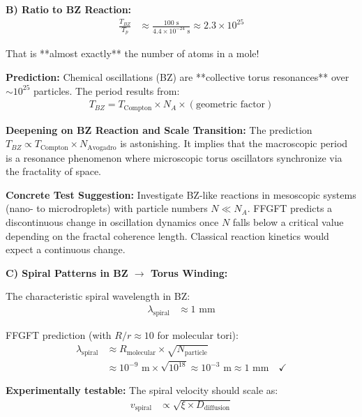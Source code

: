 	\textbf{B) Ratio to BZ Reaction:}
	\begin{align*}
		\frac{T_{BZ}}{T_p} &\approx \frac{100 \text{ s}}{4.4 \times 10^{-24} \text{ s}} \approx 2.3 \times 10^{25}
	\end{align*}
	
	That is **almost exactly** the number of atoms in a mole!
	
	\textbf{Prediction:} Chemical oscillations (BZ) are **collective torus resonances** over $\sim 10^{25}$ particles. The period results from:
	\begin{align*}
		T_{BZ} = T_{\text{Compton}} \times N_A \times (\text{geometric factor})
	\end{align*}
	
	\textbf{Deepening on BZ Reaction and Scale Transition:}
	The prediction $T_{BZ} \propto T_{\text{Compton}} \times N_{\text{Avogadro}}$ is astonishing. It implies that the macroscopic period is a resonance phenomenon where microscopic torus oscillators synchronize via the fractality of space.
	
	\textbf{Concrete Test Suggestion:} Investigate BZ-like reactions in mesoscopic systems (nano- to microdroplets) with particle numbers $N \ll N_A$. FFGFT predicts a discontinuous change in oscillation dynamics once $N$ falls below a critical value depending on the fractal coherence length. Classical reaction kinetics would expect a continuous change.
	
	\textbf{C) Spiral Patterns in BZ $\rightarrow$ Torus Winding:}
	
	The characteristic spiral wavelength in BZ:
	\begin{align*}
		\lambda_{\text{spiral}} &\approx 1 \text{ mm}
	\end{align*}
	
	FFGFT prediction (with $R/r \approx 10$ for molecular tori):
	\begin{align*}
		\lambda_{\text{spiral}} &\approx R_{\text{molecular}} \times \sqrt{N_{\text{particle}}} \\
		&\approx 10^{-9} \text{ m} \times \sqrt{10^{18}} \approx 10^{-3} \text{ m} \approx 1 \text{ mm} \quad \checkmark
	\end{align*}
	
	\textbf{Experimentally testable:} The spiral velocity should scale as:
	\begin{align*}
		v_{\text{spiral}} &\propto \sqrt{\xi \times D_{\text{diffusion}}}
	\end{align*}
	
